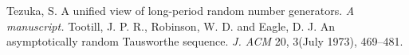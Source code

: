 \begin{thebibliography}{99}



Tezuka, S.
A unified view of long-period random number generators. {\em A manuscript.}
Tootill, J. P. R., Robinson, W. D. and Eagle, D. J.
An asymptotically random Tausworthe sequence.
{\em J. ACM} {\rm 20, 3}(July 1973), 469--481.

\end{thebibliography}

 
